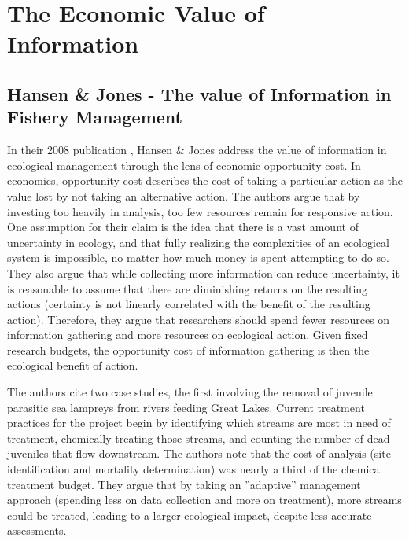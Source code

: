 \section{The Economic Value of Information}
\subsection{Hansen \& Jones - The value of Information in Fishery Management}
In their 2008 publication \cite{Hansen2008}, Hansen \& Jones address the value of information in ecological management through the lens of economic opportunity cost.  In economics, opportunity cost describes the cost of taking a particular action as the value lost by not taking an alternative action.  The authors argue that by investing too heavily in analysis, too few resources remain for responsive action.  One assumption for their claim is the idea that there is a vast amount of uncertainty in ecology, and that fully realizing the complexities of an ecological system is impossible, no matter how much money is spent attempting to do so.  They also argue that while collecting more information can reduce uncertainty, it is reasonable to assume that there are diminishing returns on the resulting actions (certainty is not linearly correlated with the benefit of the resulting action).  Therefore, they argue that researchers should spend fewer resources on information gathering and more resources on ecological action.  Given fixed research budgets, the opportunity cost of information gathering is then the ecological benefit of action.  

The authors cite two case studies, the first involving the removal of juvenile parasitic sea lampreys from rivers feeding Great Lakes.  Current treatment practices for the project begin by identifying which streams are most in need of treatment, chemically treating those streams, and counting the number of dead juveniles that flow downstream.  The authors note that the cost of analysis (site identification and mortality determination) was nearly a third of the chemical treatment budget.  They argue that by taking an ''adaptive'' management approach (spending less on data collection and more on treatment), more streams could be treated, leading to a larger ecological impact, despite less accurate assessments.

